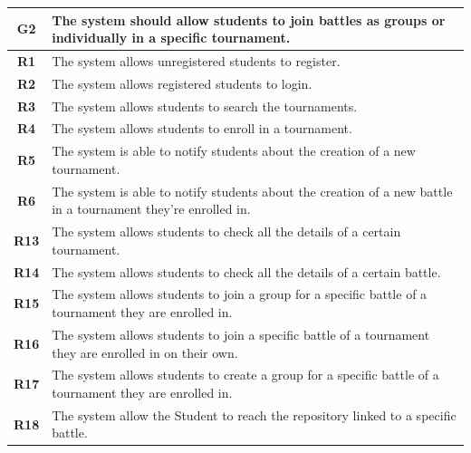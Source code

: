 \documentclass[12pt, a4paper]{report}
\begin{document}
    \begin{table}[H]
        \begin{tabularx}{\textwidth}{cX}
        \textbf{G2}  & The system should allow students to join battles as groups or individually in a specific tournament.                             \\ \hline
        \textbf{R1}  & The system allows unregistered students to register.                                                                             \\
        \textbf{R2}  & The system allows registered students to login.                                                                                  \\
        \textbf{R3}  & The system allows students to search the tournaments.                                                                            \\
        \textbf{R4}  & The system allows students to enroll in a tournament.                                                                            \\
        \textbf{R5}  & The system is able to notify students about the creation of a new tournament.                                                    \\
        \textbf{R6}  & The system is able to notify students about the creation of a new battle in a tournament they're enrolled in.                    \\
        \textbf{R13} & The system allows students to check all the details of a certain tournament.                                                     \\
        \textbf{R14} & The system allows students to check all the details of a certain battle.                                                         \\
        \textbf{R15} & The system allows students to join a group for a specific battle of a tournament they are enrolled in.                           \\
        \textbf{R16} & The system allows students to join a specific battle of a tournament they are enrolled in on their own.                          \\
        \textbf{R17} & The system allows students to create a group for a specific battle of a tournament they are enrolled in.                         \\
        \textbf{R18} & The system allow the Student to reach the repository linked to a specific battle.                                                \\

\end{tabularx}
\end{table}
\end{document}

